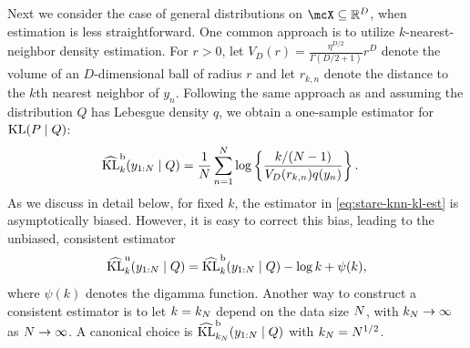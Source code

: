 Next we consider the case of general distributions on $\mcX \subseteq \mathbb{R}^{D}$,
when estimation is less straightforward.
One common approach is to utilize $k$-nearest-neighbor density estimation.
For $r > 0$, let $V_{D}(r) = \frac{\eta^{D/2}}{\Gamma(D/2+1)}r^{D}$ denote the volume of an
$D$-dimensional ball of radius $r$ and let $r_{k,n}$ denote the distance to the $k$th nearest neighbor of $y_n$.
Following the same approach as \citet{Zhao:2020} and assuming the distribution $Q$ has Lebesgue density $q$,
we obtain a one-sample estimator for $\mathrm{KL}(P \mid Q)$:
\begin{equation}
	\begin{aligned}
		\klestsub{b}{k}{y_{1:\numobs}}{Q}
		 & = \frac{1}{N}\sum_{n=1}^{\numobs} \log\left\{\frac{k/(\numobs-1)}{V_{D}(r_{k,n}) q(y_n)}\right\}.
		\label{eq:stare-knn-kl-est}
	\end{aligned}
\end{equation}
As we discuss in detail below, for fixed $k$, the estimator in \cref{eq:stare-knn-kl-est} is asymptotically biased.
However, it is easy to correct this bias, leading to the unbiased, consistent estimator
\begin{equation}
	\klestsub{u}{k}{y_{1:\numobs}}{Q} = \klestsub{b}{k}{y_{1:\numobs}}{Q} - \log k + \psi(k),
\end{equation}
where $\psi(k)$ denotes the digamma function.
Another way to construct a consistent estimator is to let $k = k_{N}$ depend on the data size $N$,
with $k_{N}  \to \infty$ as $N \to \infty$.
A canonical choice is $\mathrm{\widehat{KL}^{b}}_{k_{N}}(y_{1:N} \mid Q)$ with $k_{N}=N^{1/2}$.

